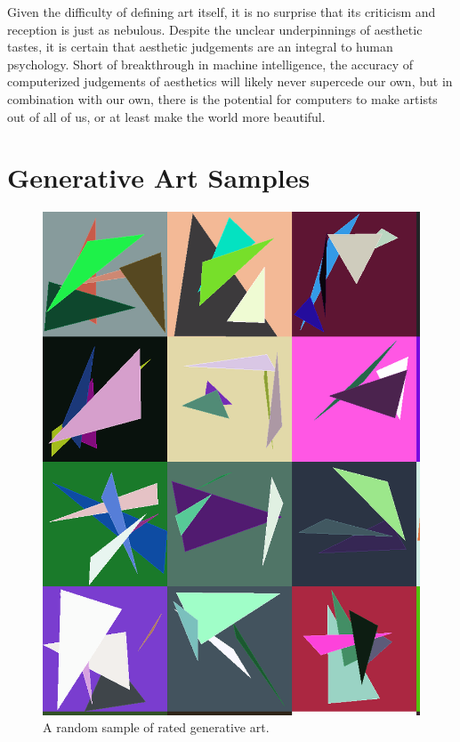 \documentclass[midd]{thesis}
\begin{document}
Given the difficulty of defining art itself, it is no surprise that its criticism and reception is just as nebulous. Despite the unclear underpinnings of aesthetic tastes, it is certain that aesthetic judgements are an integral to human psychology. Short of breakthrough in machine intelligence, the accuracy of computerized judgements of aesthetics will likely never supercede our own, but in combination with our own, there is the potential for computers to make artists out of all of us, or at least make the world more beautiful.













\appendix
\chapter{Generative Art Samples}
\begin{figure}[t]
\centering
\includegraphics[width=\textwidth]{visualizations/randomgallery-shortened.png}
\caption{A random sample of rated generative art.}
\label{fig:random-generative-art}
\end{figure}
\end{document}
